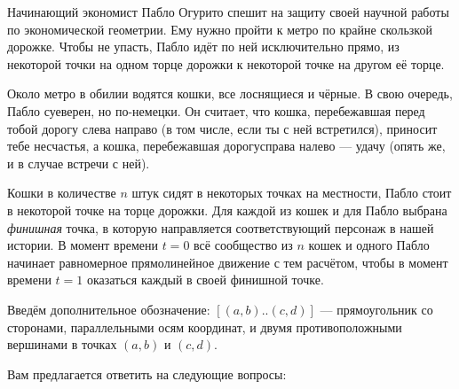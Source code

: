 
\ms Начинающий экономист Пабло Огурито спешит на защиту своей научной работы по экономической геометрии. Ему нужно пройти к метро по крайне скользкой дорожке. Чтобы не упасть, Пабло идёт по ней исключительно прямо, из некоторой точки на одном торце дорожки к некоторой точке на другом её торце.

\ms Около метро в обилии водятся кошки, все лоснящиеся и чёрные. В свою очередь, Пабло суеверен, но по-немецки. Он считает, что кошка, перебежавшая перед тобой дорогу слева направо (в том числе, если ты с ней встретился), приносит тебе несчастья, а кошка, перебежавшая дорогу\linebreak справа налево — удачу (опять же, и в случае встречи с ней).

\ms Кошки в количестве $n$ штук сидят в некоторых точках на местности, Пабло стоит в некоторой точке на торце дорожки. Для каждой из кошек и для Пабло выбрана {\itshape финишная} точка, в которую направляется соответствующий персонаж в нашей истории. В момент времени $t=0$ всё сообщество из $n$ кошек и одного Пабло начинает равномерное прямолинейное движение с тем расчётом, чтобы в момент времени $t=1$ оказаться каждый в своей финишной точке.

\ms Введём дополнительное обозначение: $[(a,b)..(c,d)]$ --- прямоугольник со сторонами, параллельными осям координат, и двумя противоположными вершинами в точках $(a,b)$ и $(c,d)$.

\ms Вам предлагается ответить на следующие вопросы:

